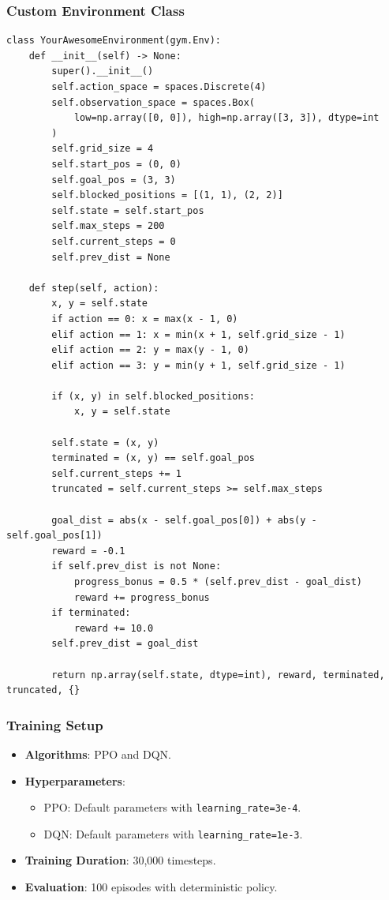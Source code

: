 \documentclass[12pt]{article}
\begin{document}
{{{\subsubsection*{Custom Environment Class}
\begin{verbatim}
class YourAwesomeEnvironment(gym.Env):
    def __init__(self) -> None:
        super().__init__()
        self.action_space = spaces.Discrete(4)
        self.observation_space = spaces.Box(
            low=np.array([0, 0]), high=np.array([3, 3]), dtype=int
        )
        self.grid_size = 4
        self.start_pos = (0, 0)
        self.goal_pos = (3, 3)
        self.blocked_positions = [(1, 1), (2, 2)]
        self.state = self.start_pos
        self.max_steps = 200
        self.current_steps = 0
        self.prev_dist = None

    def step(self, action):
        x, y = self.state
        if action == 0: x = max(x - 1, 0)
        elif action == 1: x = min(x + 1, self.grid_size - 1)
        elif action == 2: y = max(y - 1, 0)
        elif action == 3: y = min(y + 1, self.grid_size - 1)

        if (x, y) in self.blocked_positions:
            x, y = self.state

        self.state = (x, y)
        terminated = (x, y) == self.goal_pos
        self.current_steps += 1
        truncated = self.current_steps >= self.max_steps

        goal_dist = abs(x - self.goal_pos[0]) + abs(y - self.goal_pos[1])
        reward = -0.1
        if self.prev_dist is not None:
            progress_bonus = 0.5 * (self.prev_dist - goal_dist)
            reward += progress_bonus
        if terminated:
            reward += 10.0
        self.prev_dist = goal_dist

        return np.array(self.state, dtype=int), reward, terminated, truncated, {}
\end{verbatim}

\subsubsection*{Training Setup}
\begin{itemize}
    \item \textbf{Algorithms}: PPO and DQN.
    \item \textbf{Hyperparameters}:
    \begin{itemize}
        \item PPO: Default parameters with \texttt{learning\_rate=3e-4}.
        \item DQN: Default parameters with \texttt{learning\_rate=1e-3}.
    \end{itemize}
    \item \textbf{Training Duration}: 30,000 timesteps.
    \item \textbf{Evaluation}: 100 episodes with deterministic policy.
\end{itemize}

}}}
\end{document}

